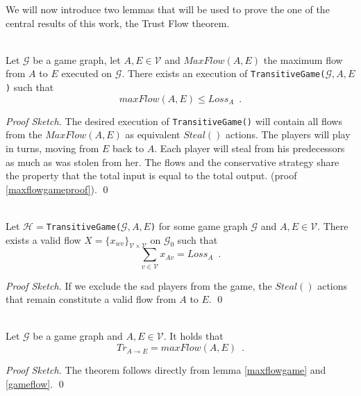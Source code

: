 \documentclass[11pt]{llncs}
\theoremstyle{definition}
\newenvironment{proofsketch}{\textit{Proof Sketch.}}{\qed \smallskip \ \\}
\begin{document}
    We will now introduce two lemmas that will be used to prove the one of the central results of this work, the Trust Flow
    theorem.
    \begin{lemma} \ \\
       \label{maxflowgame}
       Let $\mathcal{G}$ be a game graph, let $A, E \in \mathcal{V}$ and $MaxFlow\left(A, E\right)$ the maximum flow from
       $A$ to $E$ executed on $\mathcal{G}$. There exists an execution of
       \texttt{TransitiveGame(}$\mathcal{G}, A, E$\texttt{)} such that
       \begin{equation*}
          maxFlow\left(A, E\right) \leq Loss_A \enspace.
       \end{equation*}
    \end{lemma}
    \begin{proofsketch}
       The desired execution of \texttt{TransitiveGame()} will contain all flows from the $MaxFlow\left(A, E\right)$ as
       equivalent $Steal\left(\right)$ actions. The players will play in turns, moving from $E$ back to $A$. Each player will
       steal from his predecessors as much as was stolen from her. The flows and the conservative strategy share the property
       that the total input is equal to the total output.
       (proof \ref{maxflowgameproof}).
    \end{proofsketch}
    \begin{lemma} \ \\
       \label{gameflow}
       Let $\mathcal{H} = $\texttt{TransitiveGame(}$\mathcal{G}, A, E$\texttt{)} for some game graph $\mathcal{G}$ and $A,
       E \in \mathcal{V}$. There exists a valid flow
       $X = \{x_{wv}\}_{\mathcal{V} \times \mathcal{V}}$ on $\mathcal{G}_0$ such that
       \begin{equation*}
          \sum\limits_{v \in \mathcal{V}}x_{Av} = Loss_A \enspace.
       \end{equation*}
    \end{lemma}
    \begin{proofsketch}
       If we exclude the sad players from the game, the $Steal\left(\right)$ actions that remain constitute a valid flow from
       $A$ to $E$.
    \end{proofsketch}
    \begin{theorem} \ \\
       \label{trustflow}
       Let $\mathcal{G}$ be a game graph and $A, E \in \mathcal{V}$. It holds that
       \begin{equation*}
          Tr_{A \rightarrow E} = maxFlow\left(A, E\right) \enspace.
       \end{equation*}
    \end{theorem}
    \begin{proofsketch}
       The theorem follows directly from lemma \ref{maxflowgame} and \ref{gameflow}.
    \end{proofsketch}
\end{document}
